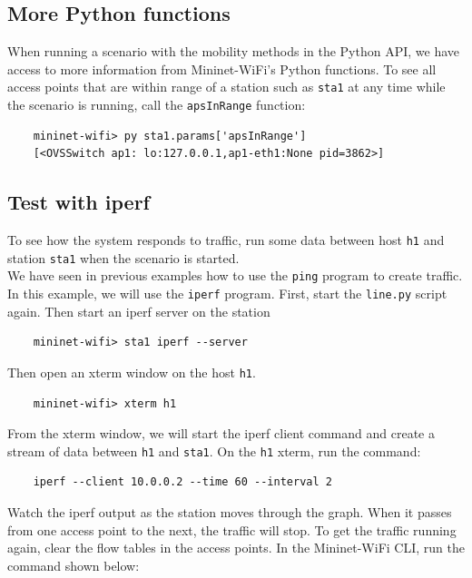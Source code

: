 \subsection{More Python functions}

When running a scenario with the mobility methods in the Python API, we have access to more information from Mininet-WiFi's Python functions. To see all access points that are within range of a station such as \texttt{sta1} at any time while the scenario is running, call the \texttt{apsInRange} function:

\begin{verbatim}
    mininet-wifi> py sta1.params['apsInRange']
    [<OVSSwitch ap1: lo:127.0.0.1,ap1-eth1:None pid=3862>]
\end{verbatim}
    
\subsection{Test with iperf}

To see how the system responds to traffic, run some data between host \texttt{h1} and station \texttt{sta1} when the scenario is started.\\

\noindent We have seen in previous examples how to use the \texttt{ping} program to create traffic. In this example, we will use the \texttt{iperf} program. First, start the \texttt{line.py} script again. Then start an iperf server on the station

\begin{verbatim}
    mininet-wifi> sta1 iperf --server 
\end{verbatim}
    

\noindent Then open an xterm window on the host \texttt{h1}. 

\begin{verbatim}
    mininet-wifi> xterm h1
\end{verbatim}
    

\noindent From the xterm window, we will start the iperf client command and create a stream of data between \texttt{h1} and \texttt{sta1}. On the \texttt{h1} xterm, run the command:

\begin{verbatim}
    iperf --client 10.0.0.2 --time 60 --interval 2 
\end{verbatim}

\noindent Watch the iperf output as the station moves through the graph. When it passes from one access point to the next, the traffic will stop. To get the traffic running again, clear the flow tables in the access points. In the Mininet-WiFi CLI, run the command shown below:

